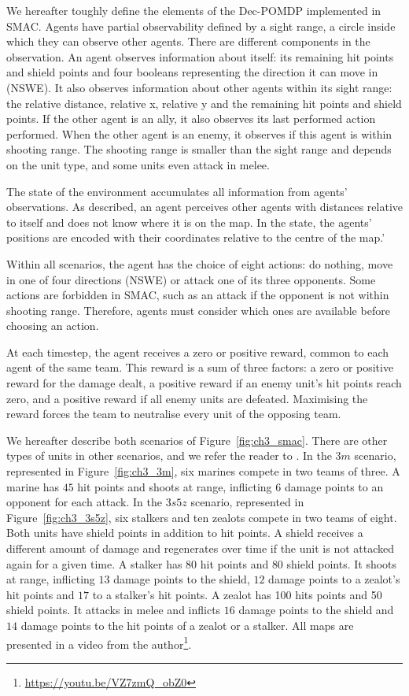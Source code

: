 We hereafter toughly define the elements of the Dec-POMDP implemented in SMAC.
Agents have partial observability defined by a sight range, a circle inside which they can observe other agents.
There are different components in the observation.
An agent observes information about itself: its remaining hit points and shield points and four booleans representing the direction it can move in (NSWE). 
It also observes information about other agents within its sight range: the relative distance, relative x, relative y and the remaining hit points and shield points. 
If the other agent is an ally, it also observes its last performed action performed.
When the other agent is an enemy, it observes if this agent is within shooting range.
The shooting range is smaller than the sight range and depends on the unit type, and some units even attack in melee.

The state of the environment accumulates all information from agents' observations.
As described, an agent perceives other agents with distances relative to itself and does not know where it is on the map.
In the state, the agents' positions are encoded with their coordinates relative to the centre of the map.'

Within all scenarios, the agent has the choice of eight actions: do nothing, move in one of four directions (NSWE) or attack one of its three opponents.
Some actions are forbidden in SMAC, such as an attack if the opponent is not within shooting range.
Therefore, agents must consider which ones are available before choosing an action.

At each timestep, the agent receives a zero or positive reward, common to each agent of the same team. 
This reward is a sum of three factors: a zero or positive reward for the damage dealt, a positive reward if an enemy unit's hit points reach zero, and a positive reward if all enemy units are defeated. 
Maximising the reward forces the team to neutralise every unit of the opposing team.

We hereafter describe both scenarios of Figure~\ref{fig:ch3_smac}.
There are other types of units in other scenarios, and we refer the reader to \citep{samvelyan2019starcraft}.
In the $3m$ scenario, represented in Figure~\ref{fig:ch3_3m}, six marines compete in two teams of three.
A marine has $45$ hit points and shoots at range, inflicting $6$ damage points to an opponent for each attack.
In the $3s5z$ scenario, represented in Figure~\ref{fig:ch3_3s5z}, six stalkers and ten zealots compete in two teams of eight.
Both units have shield points in addition to hit points.
A shield receives a different amount of damage and regenerates over time if the unit is not attacked again for a given time.
A stalker has $80$ hit points and $80$ shield points.
It shoots at range, inflicting $13$ damage points to the shield, $12$ damage points to a zealot's hit points and $17$ to a stalker's hit points.
A zealot has 100 hits points and 50 shield points.
It attacks in melee and inflicts $16$ damage points to the shield and $14$ damage points to the hit points of a zealot or a stalker.
All maps are presented in a video from the author\footnote{\url{https://youtu.be/VZ7zmQ_obZ0}}.

